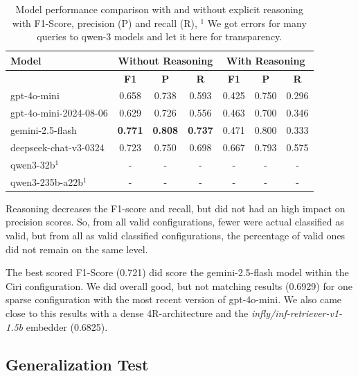 
\begin{table}[h]
    \centering
    \begin{tabular}{|l|c|c|c|c|c|c|}
        \hline
        \textbf{Model} & \multicolumn{3}{c|}{\textbf{Without Reasoning}} & \multicolumn{3}{c|}{\textbf{With Reasoning}} \\
        \hline
        & \textbf{F1} & \textbf{P} & \textbf{R} & \textbf{F1} &  \textbf{P} & \textbf{R} \\
        \hline
        gpt-4o-mini             & 0.658 & 0.738 & 0.593 & 0.425 & 0.750 & 0.296 \\
        gpt-4o-mini-2024-08-06  & 0.629 & 0.726 & 0.556 & 0.463 & 0.700 & 0.346 \\
        gemini-2.5-flash        & \textbf{0.771} & \textbf{0.808} & \textbf{0.737} & 0.471 & 0.800 & 0.333 \\
        deepseek-chat-v3-0324   & 0.723 & 0.750 & 0.698 & 0.667 & 0.793 & 0.575 \\
        qwen3-32b$^1$ & - & - & - & - & - & - \\
        qwen3-235b-a22b$^1$ & - & - & - & - & - & - \\
        \hline
    \end{tabular}
    \caption{Model performance comparison with and without explicit reasoning with F1-Score, precision (P) and recall (R), $^1$ We got errors for many queries to qwen-3 models and let it here for transparency.}
    \label{tab:model_comparison}
\end{table}

Reasoning decreases the F1-score and recall, but did not had an high impact on precision scores. So, from all valid configurations, fewer were actual classified as valid, but from all as valid classified configurations, the percentage of valid ones did not remain on the same level.

The best scored F1-Score (0.721) did score the gemini-2.5-flash model within the Ciri configuration. We did overall good, but not matching results (0.6929) for one sparse configuration with the most recent version of gpt-4o-mini. We also came close to this results with a dense 4R-architecture and the \textit{infly/inf-retriever-v1-1.5b} embedder (0.6825). 



\subsection{Generalization Test} \label{sec:exp_generalization}

